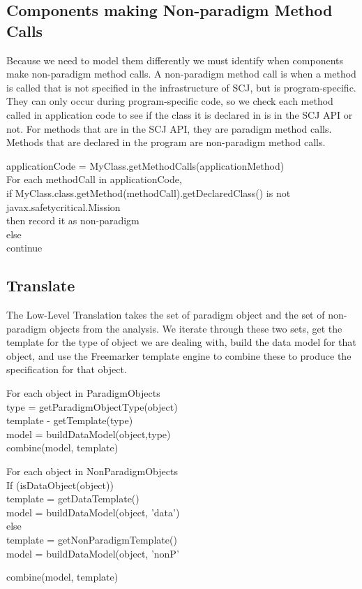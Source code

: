 \documentclass[10pt,a4paper]{article}
\newenvironment{ttSection}{\ttfamily}{\par}
\begin{document}
\subsection{Components making Non-paradigm Method Calls}
Because we need to model them differently we must identify when components make non-paradigm method calls. A non-paradigm method call is when a method is called that is not specified in the infrastructure of SCJ, but is program-specific. They can only occur during program-specific code, so we check each method called in application code to see if the class it is declared in is in the SCJ API or not. For methods that are in the SCJ API, they are paradigm method calls. Methods that are declared in the program are non-paradigm method calls. 

\begin{ttSection}
applicationCode = MyClass.getMethodCalls(applicationMethod)\\

For each methodCall in applicationCode, \\
if MyClass.class.getMethod(methodCall).getDeclaredClass() is not javax.safetycritical.Mission \\
then record it as non-paradigm\\
else\\
continue
\end{ttSection}


\subsection{Translate}



The Low-Level Translation takes the set of paradigm object and the set of non-paradigm objects from the analysis. We iterate through these two sets, get the template for the type of object we are dealing with, build the data model for that object, and use the Freemarker template engine to combine these to produce the specification for that object. 

\begin{ttSection}
For each object in ParadigmObjects \\
type = getParadigmObjectType(object) \\
template - getTemplate(type) \\
model = buildDataModel(object,type) \\
combine(model, template)
\end{ttSection}

\begin{ttSection}
For each object in NonParadigmObjects \\
If (isDataObject(object)) \\
template = getDataTemplate()\\
model = buildDataModel(object, 'data')\\
else\\
template = getNonParadigmTemplate() \\
model = buildDataModel(object, 'nonP'

combine(model, template)
\end{ttSection}
\end{document}
